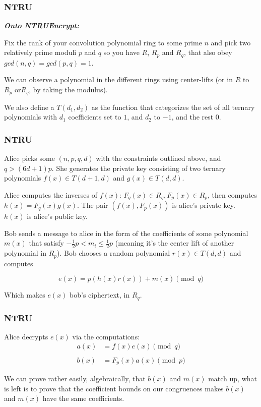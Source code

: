 \documentclass{beamer}
\begin{document}
\begin{frame}
\frametitle{NTRU}

\textbf{\textit{Onto NTRUEncrypt:}}

\vspace{1em}

Fix the rank of your convolution polynomial ring to some prime $n$ and pick two relatively prime moduli $p$ and $q$ so you have $R$, $R_p$ and $R_q$, that also obey $gcd(n, q)= gcd(p, q) = 1$.

\vspace{1em}


We can observe a polynomial in the different rings using center-lifts (or in $R$ to $R_p$ or$R_q$, by taking the modulus).

\vspace{1em}


We also define a $T(d_1, d_2)$ as the function that categorizes the set of all ternary polynomials with $d_1$ coefficients set to $1$, and $d_2$ to $-1$, and the rest 0.

\end{frame}

\begin{frame}
\frametitle{NTRU}

Alice picks some $(n, p, q, d)$ with the constraints outlined above, and $q > (6d + 1) p$. She generates the private key consisting of two ternary polynomials $f(x) \in T(d+1, d)$ and $g(x) \in T(d, d)$. 

\vspace{1em}

Alice computes the inverses of $f(x)$: $F_q(x) \in R_q, F_p(x) \in R_p$, then computes $h(x) = F_q(x)g(x)$.  The pair $(f(x), F_p(x))$ is alice's private key. $h(x)$ is alice's public key.

\vspace{1em}


Bob sends a message to alice in the form of the coefficients of some polynomial $m(x)$ that satisfy $-\frac{1}{2}p < m_i \leq \frac{1}{2}p$ (meaning it's the center lift of another polynomial in $R_p$). Bob chooses a random polynomial $r(x) \in T(d, d)$ and computes 

\[ e(x) = p(h(x)r(x)) + m(x) \pmod{q} \]

Which makes $e(x)$ bob's ciphertext, in $R_q$.


\end{frame}

\begin{frame}
\frametitle{NTRU}

Alice decrypts $e(x)$ via the computations:
\begin{align*}
a(x) &= f(x)e(x)\pmod q \\
& \\
b(x) &= F_p(x)a(x)\pmod p
\end{align*}

We can prove rather easily, algebraically, that $b(x)$ and $m(x)$ match up, what is left is to prove that the coefficient bounds on our congruences makes $b(x)$ and $m(x)$ have the same coefficients.
	
\end{frame}
\end{document}
